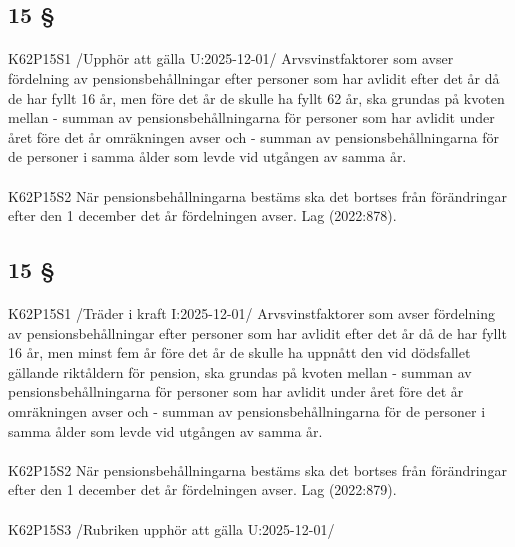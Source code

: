 \documentclass[a4paper,notitlepage,openany,10pt]{book}
\begin{document}
\subsection*{15 §}
\paragraph*{}
{\tiny K62P15S1}
/Upphör att gälla U:2025-12-01/
Arvsvinstfaktorer som avser fördelning av pensionsbehållningar efter personer som har avlidit efter det år då de har fyllt 16 år, men före det år de skulle ha fyllt 62 år, ska grundas på kvoten mellan
\newline - summan av pensionsbehållningarna för personer som har avlidit under året före det år omräkningen avser och
\newline - summan av pensionsbehållningarna för de personer i samma ålder som levde vid utgången av samma år.
\paragraph*{}
{\tiny K62P15S2}
När pensionsbehållningarna bestäms ska det bortses från förändringar efter den 1 december det år fördelningen avser.
Lag (2022:878).
\subsection*{15 §}
\paragraph*{}
{\tiny K62P15S1}
/Träder i kraft I:2025-12-01/
Arvsvinstfaktorer som avser fördelning av pensionsbehållningar efter personer som har avlidit efter det år då de har fyllt 16 år, men minst fem år före det år de skulle ha uppnått den vid dödsfallet gällande riktåldern för pension, ska grundas på kvoten mellan
\newline - summan av pensionsbehållningarna för personer som har avlidit under året före det år omräkningen avser och
\newline - summan av pensionsbehållningarna för de personer i samma ålder som levde vid utgången av samma år.
\paragraph*{}
{\tiny K62P15S2}
När pensionsbehållningarna bestäms ska det bortses från förändringar efter den 1 december det år fördelningen avser.
Lag (2022:879).
\paragraph*{}
{\tiny K62P15S3}
/Rubriken upphör att gälla U:2025-12-01/
\end{document}
